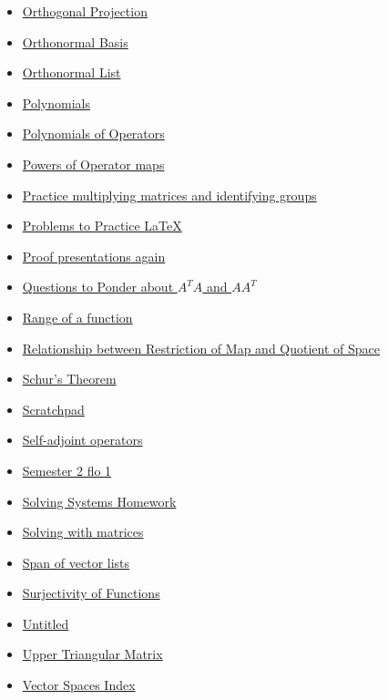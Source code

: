 \documentclass[11pt]{article}
\begin{document}
\begin{itemize}
\begin{itemize}
\item \href{math530/KBrefOrthogonalProjection.org}{Orthogonal Projection}
\item \href{math530/KBrefOrthonormalBasis.org}{Orthonormal Basis}
\item \href{math530/KBrefOrthonormal.org}{Orthonormal List}
\item \href{math530/KBrefPolynomial.org}{Polynomials}
\item \href{math530/KBrefPolynomialOfOperators.org}{Polynomials of Operators}
\item \href{math530/KBrefOperatorExponents.org}{Powers of Operator maps}
\item \href{math530/KBe2020math530retPracticeMultiplyMatrixIdentfyGroups.org}{Practice multiplying matrices and identifying groups}
\item \href{math530/20math530retProblemsPracticeLaTeX.org}{Problems to Practice \LaTeX{}}
\item \href{math530/KBe20math530flo15.org}{Proof presentations again}
\item \href{math530/KBe21math530retMatrixTransposePonderQuestions.org}{Questions to Ponder about \(A^TA\) and \(AA^T\)}
\item \href{math530/KBrefFunctionRange.org}{Range of a function}
\item \href{math530/KBcrefRestrictionAndQuotientOperators.org}{Relationship between Restriction of Map and Quotient of Space}
\item \href{math530/KBrefSchursTheorem.org}{Schur's Theorem}
\item \href{math530/20math530retScratchpad.org}{Scratchpad}
\item \href{math530/KBrefSelfAdjointOperators.org}{Self-adjoint operators}
\item \href{math530/KB20math530flo2\_1.org}{Semester 2 flo 1}
\item \href{math530/KBxSolvingSystems.org}{Solving Systems Homework}
\item \href{math530/20math530retSolvingWithMatrices.org}{Solving with matrices}
\item \href{math530/KBe20math530refSpan.org}{Span of vector lists}
\item \href{math530/KBrefSurjectiveFunction.org}{Surjectivity of Functions}
\item \href{math530/Untitled.org}{Untitled}
\item \href{math530/KBrefUpperTriangularMatrix.org}{Upper Triangular Matrix}
\item \href{math530/KBe20math530refVectorSpace.org}{Vector Spaces Index}

\end{itemize}
\end{itemize}
\end{document}
